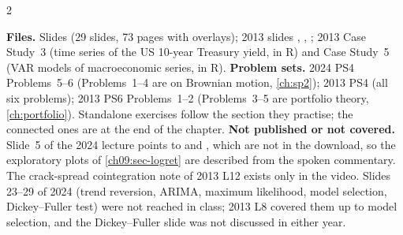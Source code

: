 \begin{paracol}{2}
\begin{sources}
\smallskip
\textbf{Files.} Slides  (29 slides, 73 pages with overlays); 2013 slides
, , ; 2013 Case Study~3
 (time series of the US 10-year Treasury yield, in R) and Case Study~5
 (VAR models of macroeconomic series, in R).
\textbf{Problem sets.} 2024 PS4 Problems~5--6 (Problems~1--4 are on Brownian motion, \cref{ch:sp2});
2013 PS4 (all six problems); 2013 PS6 Problems~1--2 (Problems~3--5 are portfolio theory,
\cref{ch:portfolio}). Standalone exercises follow the section they practise; the connected ones are at the end of the chapter.
\textbf{Not published or not covered.} Slide~5 of the 2024 lecture points to
 and , which are not in the download, so the
exploratory plots of \cref{ch09:sec-logret} are described from the spoken commentary. The
crack-spread cointegration note of 2013 L12 exists only in the video. Slides 23--29 of 2024
(trend reversion, ARIMA, maximum likelihood, model selection, Dickey--Fuller test) were not reached in
class; 2013 L8 covered them up to model selection, and the Dickey--Fuller slide was not discussed in
either year.
\end{sources}


\end{paracol}
